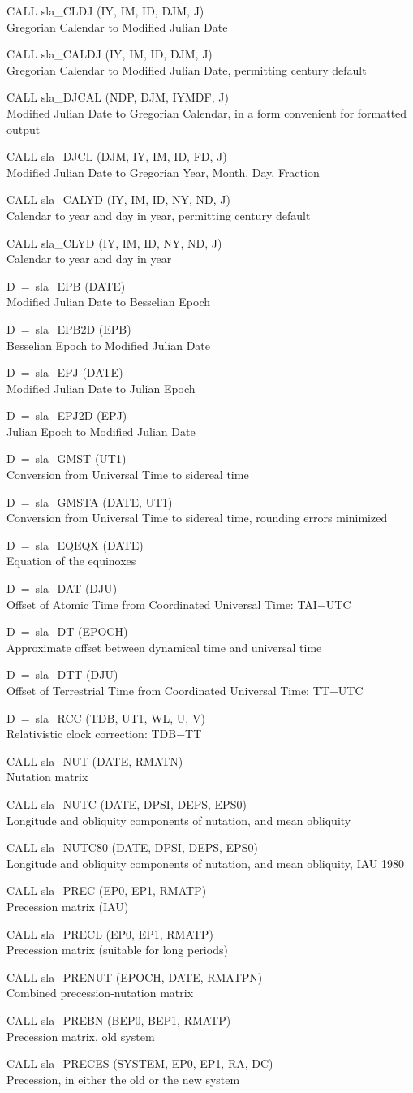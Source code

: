\documentclass[11pt,twoside,nolof]{starlink}
\providecommand{\callhead}[1]{\goodbreak\vspace{\bigskipamount}{\large\bf{#1}}}
\newenvironment{callset}{\begin{list}{}{\setlength{\leftmargin}{2cm}
                             \setlength{\parsep}{\smallskipamount}}}{\end{list}}
\providecommand{\subp}[1]{\item\hspace{-1cm}#1\\}
\begin{document}
\callhead{Calendars}
\begin{callset}
\subp{CALL sla\_CLDJ (IY, IM, ID, DJM, J)}
   Gregorian Calendar to Modified Julian Date
\subp{CALL sla\_CALDJ (IY, IM, ID, DJM, J)}
   Gregorian Calendar to Modified Julian Date,
     permitting century default
\subp{CALL sla\_DJCAL (NDP, DJM, IYMDF, J)}
   Modified Julian Date to Gregorian Calendar,
     in a form convenient for formatted output
\subp{CALL sla\_DJCL (DJM, IY, IM, ID, FD, J)}
   Modified Julian Date to Gregorian Year, Month, Day, Fraction
\subp{CALL sla\_CALYD (IY, IM, ID, NY, ND, J)}
   Calendar to year and day in year, permitting century default
\subp{CALL sla\_CLYD (IY, IM, ID, NY, ND, J)}
   Calendar to year and day in year
\subp{D~=~sla\_EPB (DATE)}
   Modified Julian Date to Besselian Epoch
\subp{D~=~sla\_EPB2D (EPB)}
   Besselian Epoch to Modified Julian Date
\subp{D~=~sla\_EPJ (DATE)}
   Modified Julian Date to Julian Epoch
\subp{D~=~sla\_EPJ2D (EPJ)}
   Julian Epoch to Modified Julian Date
\end{callset}

\callhead{Time Scales}
\begin{callset}
\subp{D~=~sla\_GMST (UT1)}
   Conversion from Universal Time to sidereal time
\subp{D~=~sla\_GMSTA (DATE, UT1)}
   Conversion from Universal Time to sidereal time, rounding errors minimized
\subp{D~=~sla\_EQEQX (DATE)}
   Equation of the equinoxes
\subp{D~=~sla\_DAT (DJU)}
   Offset of Atomic Time from Coordinated Universal Time: TAI$-$UTC
\subp{D~=~sla\_DT (EPOCH)}
   Approximate offset between dynamical time and universal time
\subp{D~=~sla\_DTT (DJU)}
   Offset of Terrestrial Time from Coordinated Universal Time: TT$-$UTC
\subp{D~=~sla\_RCC (TDB, UT1, WL, U, V)}
   Relativistic clock correction: TDB$-$TT
\end{callset}

\callhead{Precession and Nutation}
\begin{callset}
\subp{CALL sla\_NUT (DATE, RMATN)}
   Nutation matrix
\subp{CALL sla\_NUTC (DATE, DPSI, DEPS, EPS0)}
   Longitude and obliquity components of nutation, and
     mean obliquity
\subp{CALL sla\_NUTC80 (DATE, DPSI, DEPS, EPS0)}
   Longitude and obliquity components of nutation, and
     mean obliquity, IAU 1980
\subp{CALL sla\_PREC (EP0, EP1, RMATP)}
   Precession matrix (IAU)
\subp{CALL sla\_PRECL (EP0, EP1, RMATP)}
   Precession matrix (suitable for long periods)
\subp{CALL sla\_PRENUT (EPOCH, DATE, RMATPN)}
   Combined precession-nutation matrix
\subp{CALL sla\_PREBN (BEP0, BEP1, RMATP)}
   Precession matrix, old system
\subp{CALL sla\_PRECES (SYSTEM, EP0, EP1, RA, DC)}
   Precession, in either the old or the new system
\end{callset}
\end{document}
